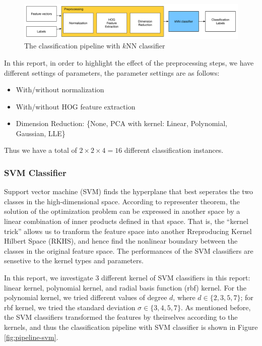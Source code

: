 \documentclass[12pt]{article}
\begin{document}
\begin{figure}[tbp]
	\centering
	\includegraphics[width =\textwidth]{pipeline-knn}		
	\caption{The classification pipeline with $k$NN classifier}
	\label{fig:pipeline-knn}
\end{figure}

In this report, in order to highlight the effect of the preprocessing steps, we have different settings of parameters, the parameter settings are as follows:
\begin{itemize}
	\item With/without normalization
	\item With/without HOG feature extraction
	\item Dimension Reduction: \{None, PCA with kernel: {Linear, Polynomial, Gaussian}, LLE\}
\end{itemize}
Thus we have a total of $2 \times 2 \times 4 = 16$ different classification instances.

\subsubsection{SVM Classifier}

Support vector machine (SVM)\cite{le1990handwritten, lecun1995comparison} finds the hyperplane that best seperates the two classes in the high-dimensional space. According to representer theorem, the solution of the optimization problem can be expressed in another space by a linear combination of inner products defined in that space. That is, the ``kernel trick'' allows us to tranform the feature space into another Rreproducing Kernel Hilbert Space (RKHS), and hence find the nonlinear boundary between the classes in the original feature space. The performances of the SVM classifiers are sensetive to the kernel types and parameters.

In this report, we investigate 3 different kernel of SVM classifiers in this report: linear kernel, polynomial kernel, and radial basis function (rbf) kernel. For the polynomial kernel, we tried different values of degree $d$, where $d \in \{2,3,5,7\}$; for rbf kernel, we tried the standard deviation $\sigma \in \{3, 4, 5, 7\}$. As mentioned before, the SVM classifiers transformed the features by theirselves according to the kernels, and thus the classification pipeline with SVM classifier is shown in Figure \ref{fig:pipeline-svm}.
\end{document}
